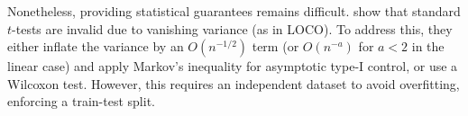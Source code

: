 \documentclass{article}
\theoremstyle{plain}
\theoremstyle{definition}
\theoremstyle{remark}
\begin{document}

Nonetheless, providing statistical guarantees remains difficult. \citet{reyerolobo2025conditionalfeatureimportancerevisited} show that standard $t$-tests are invalid due to vanishing variance (as in LOCO). To address this, they either inflate the variance by an $O(n^{-1/2})$ term (or $O(n^{-a})$ for $a<2$ in the linear case) and apply Markov's inequality for asymptotic type-I control, or use a Wilcoxon test. However, this requires an independent dataset to avoid overfitting, enforcing a train-test split.

%
%
\end{document}
